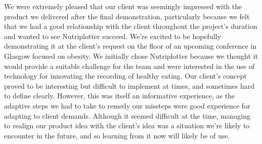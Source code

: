 \documentclass{l3proj}
\begin{document}
We were extremely pleased that our client was seemingly impressed with the product we delivered after the final demonstration, particularly because we felt that we had a good relationship with the client throughout the project's duration and wanted to see Nutriplotter succeed. We're excited to be hopefully demonstrating it at the client's request on the floor of an upcoming conference in Glasgow focused on obesity. We initially chose Nutriplotter because we thought it would provide a suitable challenge for the team and were interested in the use of technology for innovating the recording of healthy eating. Our client's concept proved to be interesting but difficult to implement at times, and sometimes hard to define clearly. However, this was itself an informative experience, as the adaptive steps we had to take to remedy our missteps were good experience for adapting to client demands. Although it seemed difficult at the time, managing to realign our product idea with the client's idea was a situation we're likely to encounter in the future, and so learning from it now will likely be of use.\par





\end{document}
